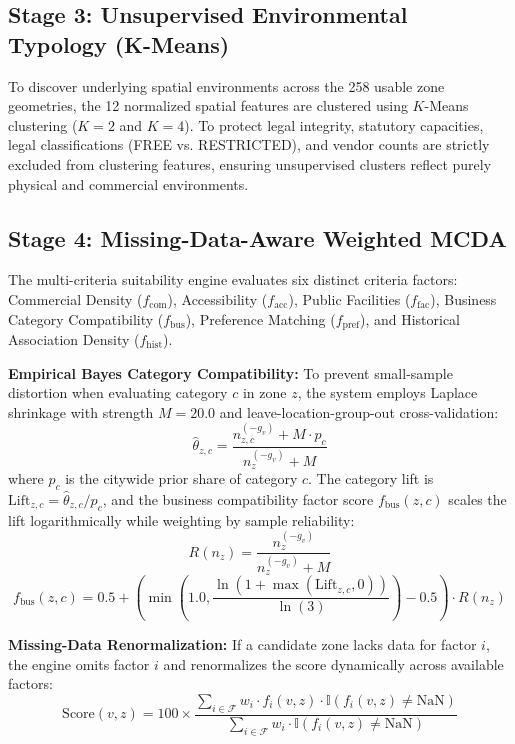 \subsection{Stage 3: Unsupervised Environmental Typology (K-Means)}
To discover underlying spatial environments across the 258 usable zone geometries, the 12 normalized spatial features are clustered using $K$-Means clustering ($K=2$ and $K=4$). To protect legal integrity, statutory capacities, legal classifications (FREE vs. RESTRICTED), and vendor counts are strictly excluded from clustering features, ensuring unsupervised clusters reflect purely physical and commercial environments.

\subsection{Stage 4: Missing-Data-Aware Weighted MCDA}
The multi-criteria suitability engine evaluates six distinct criteria factors: Commercial Density ($f_{\text{com}}$), Accessibility ($f_{\text{acc}}$), Public Facilities ($f_{\text{fac}}$), Business Category Compatibility ($f_{\text{bus}}$), Preference Matching ($f_{\text{pref}}$), and Historical Association Density ($f_{\text{hist}}$).

\noindent \textbf{Empirical Bayes Category Compatibility:} To prevent small-sample distortion when evaluating category $c$ in zone $z$, the system employs Laplace shrinkage with strength $M = 20.0$ and leave-location-group-out cross-validation:
\begin{equation}
    \hat{\theta}_{z,c} = \frac{n_{z,c}^{(-g_v)} + M \cdot p_c}{n_z^{(-g_v)} + M}
    \label{eq:shrinkage_form}
\end{equation}
where $p_c$ is the citywide prior share of category $c$. The category lift is $\text{Lift}_{z,c} = \hat{\theta}_{z,c} / p_c$, and the business compatibility factor score $f_{\text{bus}}(z, c)$ scales the lift logarithmically while weighting by sample reliability:
\begin{equation}
    R(n_z) = \frac{n_z^{(-g_v)}}{n_z^{(-g_v)} + M}
\end{equation}
\begin{equation}
    f_{\text{bus}}(z, c) = 0.5 + \left( \min\left(1.0, \frac{\ln(1 + \max(\text{Lift}_{z,c}, 0))}{\ln(3)}\right) - 0.5 \right) \cdot R(n_z)
    \label{eq:fbus_form}
\end{equation}

\noindent \textbf{Missing-Data Renormalization:} If a candidate zone lacks data for factor $i$, the engine omits factor $i$ and renormalizes the score dynamically across available factors:
\begin{equation}
    \text{Score}(v, z) = 100 \times \frac{\sum_{i \in \mathcal{F}} w_i \cdot f_i(v, z) \cdot \mathbb{I}(f_i(v, z) \ne \text{NaN})}{\sum_{i \in \mathcal{F}} w_i \cdot \mathbb{I}(f_i(v, z) \ne \text{NaN})}
    \label{eq:mcda_norm_form}
\end{equation}

